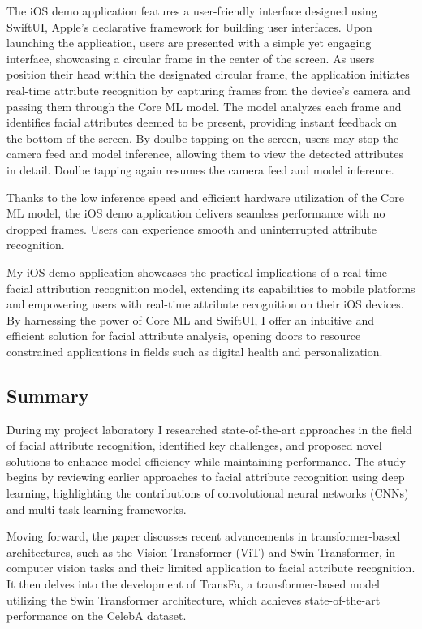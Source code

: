 \documentclass[a4paper,oneside]{article}
\begin{document}
The iOS demo application features a user-friendly interface designed using SwiftUI, Apple's declarative framework for building user interfaces.
Upon launching the application, users are presented with a simple yet engaging interface, showcasing a circular frame in the center of the screen.
As users position their head within the designated circular frame, the application initiates real-time attribute recognition by capturing frames from the device's camera and passing them through the Core ML model.
The model analyzes each frame and identifies facial attributes deemed to be present, providing instant feedback on the bottom of the screen.
By doulbe tapping on the screen, users may stop the camera feed and model inference, allowing them to view the detected attributes in detail.
Doulbe tapping again resumes the camera feed and model inference.

Thanks to the low inference speed and efficient hardware utilization of the Core ML model, the iOS demo application delivers seamless performance with no dropped frames.
Users can experience smooth and uninterrupted attribute recognition.

My iOS demo application showcases the practical implications of a real-time facial attribution recognition model, extending its capabilities to mobile platforms and empowering users with real-time attribute recognition on their iOS devices.
By harnessing the power of Core ML and SwiftUI, I offer an intuitive and efficient solution for facial attribute analysis, opening doors to resource constrained applications in fields such as digital health and personalization.

\clearpage
\subsection{Summary}
\label{sec:summary}

During my project laboratory I researched state-of-the-art approaches in the field of facial attribute recognition, identified key challenges, and proposed novel solutions to enhance model efficiency while maintaining performance.
The study begins by reviewing earlier approaches to facial attribute recognition using deep learning, highlighting the contributions of convolutional neural networks (CNNs) and multi-task learning frameworks.

Moving forward, the paper discusses recent advancements in transformer-based architectures, such as the Vision Transformer (ViT) and Swin Transformer, in computer vision tasks and their limited application to facial attribute recognition.
It then delves into the development of TransFa, a transformer-based model utilizing the Swin Transformer architecture, which achieves state-of-the-art performance on the CelebA dataset.
\end{document}
